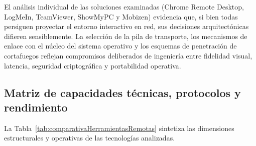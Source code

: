 \documentclass[12pt]{article}
\begin{document}
El análisis individual de las soluciones examinadas (Chrome Remote Desktop, LogMeIn, TeamViewer, ShowMyPC y Mobizen) evidencia que, si bien todas persiguen proyectar el entorno interactivo en red, sus decisiones arquitectónicas difieren sensiblemente. La selección de la pila de transporte, los mecanismos de enlace con el núcleo del sistema operativo y los esquemas de penetración de cortafuegos reflejan compromisos deliberados de ingeniería entre fidelidad visual, latencia, seguridad criptográfica y portabilidad operativa.

\subsection{Matriz de capacidades técnicas, protocolos y rendimiento}\label{sec:matrizComparativa}

La Tabla~\ref{tab:comparativaHerramientasRemotas} sintetiza las dimensiones estructurales y operativas de las tecnologías analizadas.
\end{document}
